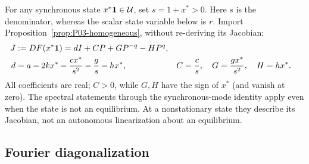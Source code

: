 For any synchronous state $x^*\mathbf{1}\in\mathcal{U}$, set $s=1+x^*>0$.
Here $s$ is the denominator, whereas the scalar state variable below
is $r$. Import Proposition~\ref{prop:P03-homogeneous}, without
re-deriving its Jacobian:
\begin{align}
 J&:=DF(x^*\mathbf{1})=dI+CP+GP^{-q}-HP^q,\label{eq:P04-input}\\
 d&=a-2kx^*-\frac{cx^*}{s^2}-\frac{g}{s}-hx^*,
 &C&=\frac{c}{s},\quad G=\frac{gx^*}{s^2},\quad H=hx^*.
 \label{eq:P04-coefficients}
\end{align}
All coefficients are real; $C>0$, while $G,H$ have the sign of
$x^*$ (and vanish at zero). The spectral statements through the
synchronous-mode identity apply even when the state is not an
equilibrium. At a nonstationary state they describe its Jacobian,
not an autonomous linearization about an equilibrium.

\subsection{Fourier diagonalization}
\label{slot:P04-1}


